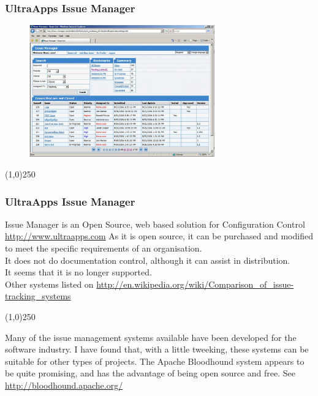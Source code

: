\begin{frame}
\frametitle{UltraApps Issue Manager}

\begin{figure}
	\centering
		\includegraphics[width = 8cm]{images/issuemanager.jpg}
	\label{fig:issuemanager}
\end{figure} 
\end{frame}\begin{center}\line(1,0){250}\end{center}
%
%

\begin{frame}
\frametitle{UltraApps Issue Manager}
Issue Manager is an Open Source, web based solution for Configuration Control
\href{http://www.ultraapps.com}{http://www.ultraapps.com}
As it is open source, it can be purchased and modified to meet the specific requirements of an organisation.\\
It does not do documentation control, although it can assist in distribution.\\
It seems that it is no longer supported.\\
Other systems listed on \href{http://en.wikipedia.org/wiki/Comparison\_of\_issue-tracking\_systems}{http://en.wikipedia.org/wiki/Comparison\_of\_issue-tracking\_systems}
\end{frame}\begin{center}\line(1,0){250}\end{center}
Many of the issue management systems available have been developed for the software industry.  I have found that, with a little tweeking, these systems can be suitable for other types of projects.  The Apache Bloodhound system appears to be quite promising, and has the advantage of being open source and free. See \href{http://bloodhound.apache.org/}{http://bloodhound.apache.org/}
%
%



